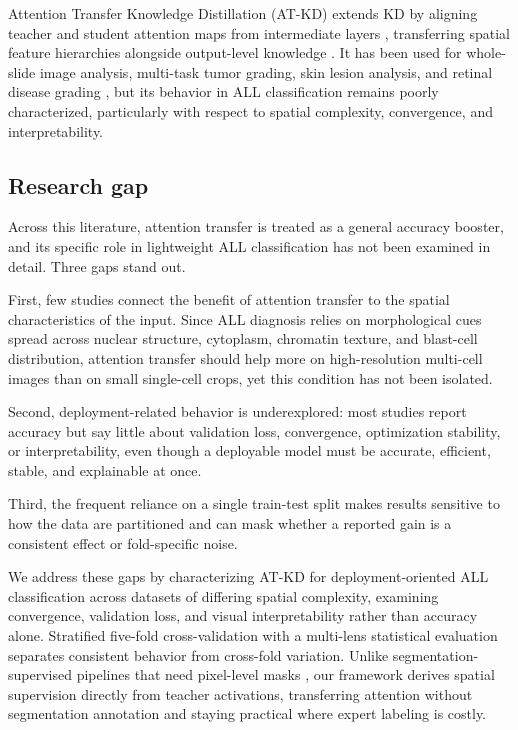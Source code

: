 \documentclass[preprint,review,12pt]{elsarticle}
\begin{document}
Attention Transfer Knowledge Distillation (AT-KD) extends KD by aligning
teacher and student attention maps from intermediate layers \cite{ref12},
transferring spatial feature hierarchies alongside output-level knowledge
\cite{ref34}. It has been used for whole-slide image analysis, multi-task
tumor grading, skin lesion analysis, and retinal disease grading
\cite{ref13,ref14,ref15,ref42}, but its behavior in ALL classification
remains poorly characterized, particularly with respect to spatial
complexity, convergence, and interpretability.

\subsection{Research gap}

Across this literature, attention transfer is treated as a general
accuracy booster, and its specific role in lightweight ALL classification
has not been examined in detail. Three gaps stand out.

First, few studies connect the benefit of attention transfer to the
spatial characteristics of the input. Since ALL diagnosis relies on
morphological cues spread across nuclear structure, cytoplasm, chromatin
texture, and blast-cell distribution, attention transfer should help more
on high-resolution multi-cell images than on small single-cell crops, yet
this condition has not been isolated.

Second, deployment-related behavior is underexplored: most studies report
accuracy but say little about validation loss, convergence, optimization
stability, or interpretability, even though a deployable model must be
accurate, efficient, stable, and explainable at once.

Third, the frequent reliance on a single train-test split makes results
sensitive to how the data are partitioned and can mask whether a reported
gain is a consistent effect or fold-specific noise.

We address these gaps by characterizing AT-KD for deployment-oriented ALL
classification across datasets of differing spatial complexity, examining
convergence, validation loss, and visual interpretability rather than
accuracy alone. Stratified five-fold cross-validation with a multi-lens
statistical evaluation separates consistent behavior from cross-fold
variation. Unlike segmentation-supervised pipelines that need pixel-level
masks \cite{ref43}, our framework derives spatial supervision directly
from teacher activations, transferring attention without segmentation
annotation and staying practical where expert labeling is costly.
\end{document}
